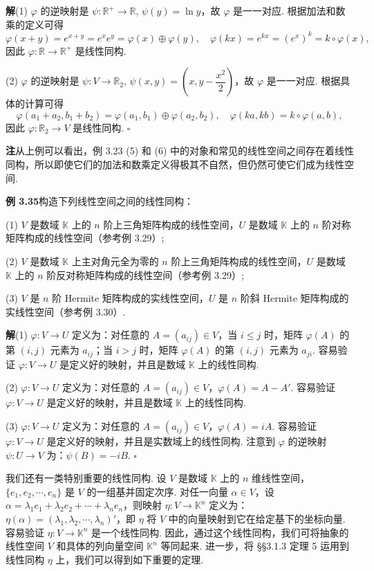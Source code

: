\documentclass[UTF8, 12pt, fontset=fandol, oneside]{ctexart}
\begin{document}
\noindent\textbf{解}\quad (1) $\varphi$ 的逆映射是 $\psi:\mathbb{R}^+\to\mathbb{R}$, $\psi(y)=\ln y$，故 $\varphi$ 是一一对应. 根据加法和数乘的定义可得
\[
\varphi(x+y)=e^{x+y}=e^xe^y=\varphi(x)\oplus\varphi(y),\quad
\varphi(kx)=e^{kx}=(e^x)^k=k\circ\varphi(x),
\]
因此 $\varphi:\mathbb{R}\to\mathbb{R}^+$ 是线性同构.

(2) $\varphi$ 的逆映射是 $\psi:V\to\mathbb{R}_2$, $\psi(x,y)=\left(x,y-\dfrac{x^2}{2}\right)$，故 $\varphi$ 是一一对应. 根据具体的计算可得
\[
\varphi(a_1+a_2,b_1+b_2)=\varphi(a_1,b_1)\oplus\varphi(a_2,b_2),\quad
\varphi(ka,kb)=k\circ\varphi(a,b),
\]
因此 $\varphi:\mathbb{R}_2\to V$ 是线性同构. $\square$

\noindent\textbf{注}\quad 从上例可以看出，例 3.23 (5) 和 (6) 中的对象和常见的线性空间之间存在着线性同构，所以即使它们的加法和数乘定义得极其不自然，但仍然可使它们成为线性空间.

\noindent\textbf{例 3.35}\quad 构造下列线性空间之间的线性同构：

(1) $V$ 是数域 $\mathbb{K}$ 上的 $n$ 阶上三角矩阵构成的线性空间，$U$ 是数域 $\mathbb{K}$ 上的 $n$ 阶对称矩阵构成的线性空间（参考例 3.29）;

(2) $V$ 是数域 $\mathbb{K}$ 上主对角元全为零的 $n$ 阶上三角矩阵构成的线性空间，$U$ 是数域 $\mathbb{K}$ 上的 $n$ 阶反对称矩阵构成的线性空间（参考例 3.29）;

(3) $V$ 是 $n$ 阶 Hermite 矩阵构成的实线性空间，$U$ 是 $n$ 阶斜 Hermite 矩阵构成的实线性空间（参考例 3.30）.

\noindent\textbf{解}\quad (1) $\varphi:V\to U$ 定义为：对任意的 $A=(a_{ij})\in V$，当 $i\le j$ 时，矩阵 $\varphi(A)$ 的第 $(i,j)$ 元素为 $a_{ij}$；当 $i>j$ 时，矩阵 $\varphi(A)$ 的第 $(i,j)$ 元素为 $a_{ji}$. 容易验证 $\varphi:V\to U$ 是定义好的映射，并且是数域 $\mathbb{K}$ 上的线性同构.

(2) $\varphi:V\to U$ 定义为：对任意的 $A=(a_{ij})\in V$，$\varphi(A)=A-A'$. 容易验证 $\varphi:V\to U$ 是定义好的映射，并且是数域 $\mathbb{K}$ 上的线性同构.

(3) $\varphi:V\to U$ 定义为：对任意的 $A=(a_{ij})\in V$，$\varphi(A)=iA$. 容易验证 $\varphi:V\to U$ 是定义好的映射，并且是实数域上的线性同构. 注意到 $\varphi$ 的逆映射 $\psi:U\to V$ 为：$\psi(B)=-iB$. $\square$

我们还有一类特别重要的线性同构. 设 $V$ 是数域 $\mathbb{K}$ 上的 $n$ 维线性空间，$\{e_1,e_2,\cdots,e_n\}$ 是 $V$ 的一组基并固定次序. 对任一向量 $\alpha\in V$，设 $\alpha=\lambda_1e_1+\lambda_2e_2+\cdots+\lambda_ne_n$，则映射 $\eta:V\to\mathbb{K}^n$ 定义为：$\eta(\alpha)=(\lambda_1,\lambda_2,\cdots,\lambda_n)'$，即 $\eta$ 将 $V$ 中的向量映射到它在给定基下的坐标向量. 容易验证 $\eta:V\to\mathbb{K}^n$ 是一个线性同构. 因此，通过这个线性同构，我们可将抽象的线性空间 $V$ 和具体的列向量空间 $\mathbb{K}^n$ 等同起来. 进一步，将 §§3.1.3 定理 5 运用到线性同构 $\eta$ 上，我们可以得到如下重要的定理.
\end{document}
